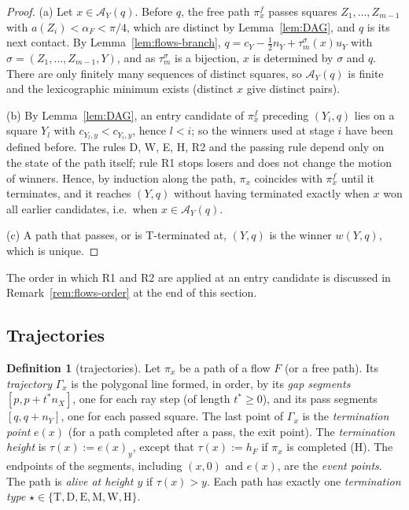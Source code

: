 \documentclass[11pt]{amsart}
\theoremstyle{definition}
\newtheorem{definition}[theorem]{Definition}
\theoremstyle{remark}
\numberwithin{equation}{section}
\begin{document}
\begin{proof}
(a) Let $x\in\mathcal A_Y(q)$. Before $q$, the free path $\pi^f_x$ passes squares $Z_1,\dots,Z_{m-1}$ with
$a(Z_i)<\alpha_F<\pi/4$, which are distinct by Lemma~\ref{lem:DAG}, and $q$ is its next contact. By
Lemma~\ref{lem:flows-branch}, $q=c_Y-\frac12n_Y+\tau^\sigma_m(x)u_Y$ with $\sigma=(Z_1,\dots,Z_{m-1},Y)$, and as
$\tau^\sigma_m$ is a bijection, $x$ is determined by $\sigma$ and $q$. There are only finitely many sequences of
distinct squares, so $\mathcal A_Y(q)$ is finite and the lexicographic minimum exists (distinct $x$ give distinct
pairs).

(b) By Lemma~\ref{lem:DAG}, an entry candidate of $\pi^f_x$ preceding $(Y_i,q)$ lies on a square $Y_l$ with
$c_{Y_l,y}<c_{Y_i,y}$, hence $l<i$; so the winners used at stage $i$ have been defined before. The rules D, W, E, H, R2
and the passing rule depend only on the state of the path itself; rule R1 stops losers and does not change the motion
of winners. Hence, by induction along the path, $\pi_x$ coincides with $\pi^f_x$ until it terminates, and it reaches
$(Y,q)$ without having terminated exactly when $x$ won all earlier candidates, i.e.\ when $x\in\mathcal A_Y(q)$.

(c) A path that passes, or is T-terminated at, $(Y,q)$ is the winner $w(Y,q)$, which is unique.
\end{proof}

The order in which R1 and R2 are applied at an entry candidate is discussed in Remark~\ref{rem:flows-order} at the
end of this section.

\subsection{Trajectories}\label{ssec:flows-traj}

\begin{definition}[trajectories]\label{def:flows-traj}
Let $\pi_x$ be a path of a flow $F$ (or a free path). Its \emph{trajectory} $\Gamma_x$ is the polygonal line formed,
in order, by its \emph{gap segments} $[p,p+t^*n_X]$, one for each ray step (of length $t^*\ge0$), and its pass
segments $[q,q+n_Y]$, one for each passed square. The last point of $\Gamma_x$ is the \emph{termination point}
$e(x)$ (for a path completed after a pass, the exit point). The \emph{termination height} is $\tau(x):=e(x)_y$, except
that $\tau(x):=h_F$ if $\pi_x$ is completed (H). The endpoints of the segments, including $(x,0)$ and $e(x)$, are the
\emph{event points}. The path is \emph{alive at height $y$} if $\tau(x)>y$. Each path has exactly one
\emph{termination type} $\star\in\{\mathrm T,\mathrm D,\mathrm E,\mathrm M,\mathrm W,\mathrm H\}$.
\end{definition}
\end{document}
